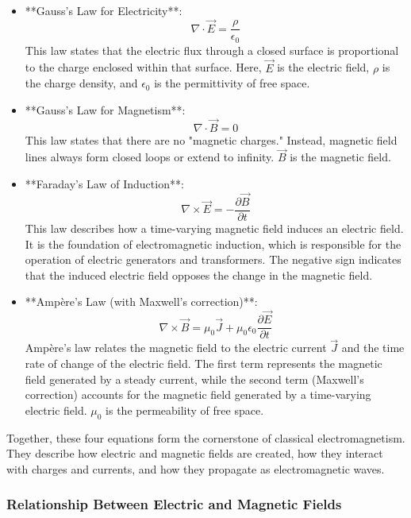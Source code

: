 \documentclass{article}
\begin{document}
\begin{itemize}
    \item **Gauss's Law for Electricity**:
    \[
    \nabla \cdot \vec{E} = \frac{\rho}{\epsilon_0}
    \]
    This law states that the electric flux through a closed surface is proportional to the charge enclosed within that surface. Here, \( \vec{E} \) is the electric field, \( \rho \) is the charge density, and \( \epsilon_0 \) is the permittivity of free space.
    
    \item **Gauss's Law for Magnetism**:
    \[
    \nabla \cdot \vec{B} = 0
    \]
    This law states that there are no "magnetic charges." Instead, magnetic field lines always form closed loops or extend to infinity. \( \vec{B} \) is the magnetic field.

    \item **Faraday's Law of Induction**:
    \[
    \nabla \times \vec{E} = -\frac{\partial \vec{B}}{\partial t}
    \]
    This law describes how a time-varying magnetic field induces an electric field. It is the foundation of electromagnetic induction, which is responsible for the operation of electric generators and transformers. The negative sign indicates that the induced electric field opposes the change in the magnetic field.

    \item **Ampère's Law (with Maxwell's correction)**:
    \[
    \nabla \times \vec{B} = \mu_0 \vec{J} + \mu_0 \epsilon_0 \frac{\partial \vec{E}}{\partial t}
    \]
    Ampère's law relates the magnetic field to the electric current \( \vec{J} \) and the time rate of change of the electric field. The first term represents the magnetic field generated by a steady current, while the second term (Maxwell’s correction) accounts for the magnetic field generated by a time-varying electric field. \( \mu_0 \) is the permeability of free space.

\end{itemize}

Together, these four equations form the cornerstone of classical electromagnetism. They describe how electric and magnetic fields are created, how they interact with charges and currents, and how they propagate as electromagnetic waves.

\subsubsection*{Relationship Between Electric and Magnetic Fields}
\end{document}
